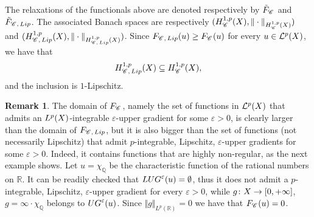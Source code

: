 \documentclass[12pt]{amsart}
\newcommand{\Q}{\mathbb{Q}}
\newcommand{\R}{\mathbb{R}}
\newcommand{\X}{{\rm X}}
\newcommand{\Lip}{{\rm Lip}}
\newcommand{\F}{{\rm F}}
\theoremstyle{definition}
\newtheorem{remark}[theorem]{Remark}
\newcommand{\Chain}[1]{\mathscr{C}^{#1}}
\newcommand{\UG}[1]{{\rm UG}^{#1}}
\newcommand{\LUG}[1]{{\rm LUG}^{#1}}
\newcommand{\calL}[1]{\mathcal{L}^{#1}}
\newcommand{\HH}[2]{H^{1,#1}_{{\rm #2}}}
\renewcommand{\F}[1]{{\rm F}_{{\rm #1}}}
\newcommand{\relF}[1]{\tilde{\rm F}_{{\rm #1}}}
\begin{document}
The relaxations of the functionals above are denoted respectively by $\relF{\Chain{}}$ and $\relF{\Chain{}, \,\Lip}$. The associated Banach spaces are respectively $(\HH{p}{\Chain{}}(\X), \Vert \cdot \Vert_{\HH{p}{\Chain{}}(\X)})$ and $(\HH{p}{\Chain{}, \, \Lip}(\X), \Vert \cdot \Vert_{\HH{p}{\Chain{}, \, \Lip}(\X)})$. Since $\F{\Chain{}, \, \Lip}(u) \ge \F{\Chain{}}(u)$ for every $u\in \calL{p}(\X)$, we have that 
$$\HH{p}{\Chain{},\,\Lip}(\X) \subseteq \HH{p}{\Chain{}}(\X),$$
and the inclusion is $1$-Lipschitz.
%
\begin{remark}
    The domain of $\F{\Chain{}}$, namely the set of functions in $\calL{p}(\X)$ that admits an $L^p(\X)$-integrable $\varepsilon$-upper gradient for some $\varepsilon > 0$, is clearly larger than the domain of $\F{\Chain{},\,\Lip}$, but it is also bigger than the set of functions (not necessarily Lipschitz) that admit $p$-integrable, Lipschitz, $\varepsilon$-upper gradients for some $\varepsilon > 0$. Indeed, it contains functions that are highly non-regular, as the next example shows. Let $u = \chi_\Q$ be the characteristic function of the rational numbers on $\R$. It can be readily checked that $\LUG{\varepsilon}(u) = \emptyset$, thus it does not admit a $p$-integrable, Lipschitz, $\varepsilon$-upper gradient for every $\varepsilon > 0$, while $g\colon \X \to [0,+\infty]$, $g = \infty \cdot \chi_\Q$ belongs to $\UG{\varepsilon}(u)$. Since $\Vert g \Vert_{L^p(\R)} = 0$ we have that $\F{\Chain{}}(u) = 0$.
\end{remark}
%
\end{document}
